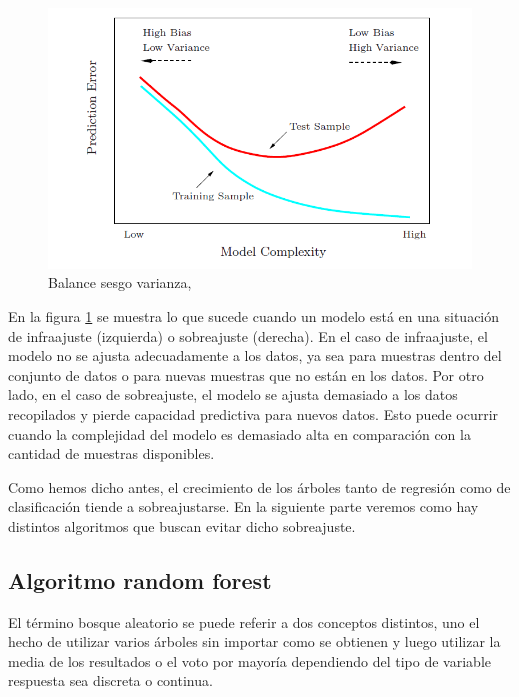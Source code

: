 \begin{figure}[h]
\centering
\includegraphics[scale=0.65]{Documentos Extra/Imagenes/Bias-Variance-Tradeoff.png}
\caption{Balance sesgo varianza, \cite{Hastie 2001}}
\label{fig:Balance-sesgo-varianza}
\end{figure}
 
\noindent En la figura \ref{fig:Balance-sesgo-varianza} se muestra lo que sucede cuando un modelo está en una situación de infraajuste (izquierda) o sobreajuste (derecha). En el caso de infraajuste, el modelo no se ajusta adecuadamente a los datos, ya sea para muestras dentro del conjunto de datos o para nuevas muestras que no están en los datos. Por otro lado, en el caso de sobreajuste, el modelo se ajusta demasiado a los datos recopilados y pierde capacidad predictiva para nuevos datos. Esto puede ocurrir cuando la complejidad del modelo es demasiado alta en comparación con la cantidad de muestras disponibles. 

\noindent Como hemos dicho antes, el crecimiento de los árboles tanto de regresión como de clasificación tiende a  sobreajustarse. En la siguiente parte veremos como hay distintos algoritmos que buscan evitar dicho sobreajuste. 

\newpage
\subsection{Algoritmo random forest}

\noindent El término bosque aleatorio se puede referir a dos conceptos distintos, uno el hecho de utilizar varios árboles sin importar como se obtienen y luego utilizar la media de los resultados o el voto por mayoría dependiendo del tipo de variable respuesta sea discreta o continua. 

